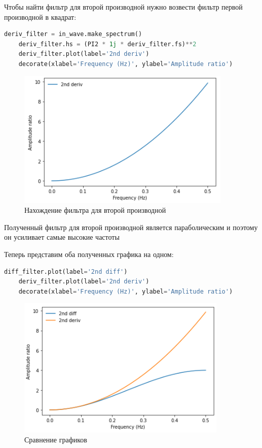 \documentclass[a4paper]{article}
\begin{document}
            Чтобы найти фильтр для второй производной нужно возвести фильтр первой производной в квадрат:
            
\begin{lstlisting}[language=Python, caption= Нахождение фильтра для второй производной]
    deriv_filter = in_wave.make_spectrum()
    deriv_filter.hs = (PI2 * 1j * deriv_filter.fs)**2
    deriv_filter.plot(label='2nd deriv')
    decorate(xlabel='Frequency (Hz)', ylabel='Amplitude ratio')
\end{lstlisting}
            
            \begin{figure}[H]
                \centering
                \includegraphics{ex_5_6.png}
                \caption{Нахождение фильтра для второй производной}
                \label{fig:ex_5_6}
            \end{figure}
            
            Полученный фильтр для второй производной является параболическим и поэтому он усиливает самые высокие частоты
            
            Теперь представим оба полученных графика на одном:
            
\begin{lstlisting}[language=Python, caption= Сравнение графиков]
    diff_filter.plot(label='2nd diff')
    deriv_filter.plot(label='2nd deriv')
    decorate(xlabel='Frequency (Hz)', ylabel='Amplitude ratio')
\end{lstlisting}
            
            \begin{figure}[H]
                \centering
                \includegraphics{ex_5_7.png}
                \caption{Сравнение графиков}
                \label{fig:ex_5_7}
            \end{figure}
            
\end{document}
